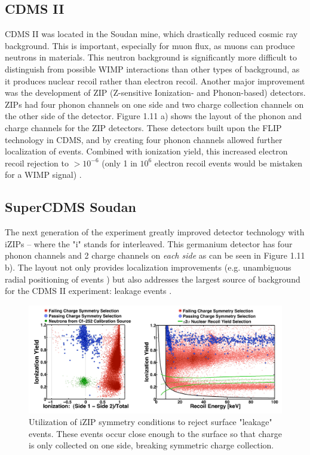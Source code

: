 \documentclass{report}
\begin{document}
\subsection{CDMS II}

CDMS II was located in the Soudan mine, which drastically reduced cosmic ray background. This is important, especially for muon flux, as muons can produce neutrons in materials. This neutron background is significantly more difficult to distinguish from possible WIMP interactions than other types of background, as it produces nuclear recoil rather than electron recoil. Another major improvement was the development of ZIP (Z-sensitive Ionization- and Phonon-based) detectors. ZIPs had four phonon channels on one side and two charge collection channels on the other side of the detector. Figure 1.11 a) shows the layout of the phonon and charge channels for the ZIP detectors. These detectors built upon the FLIP technology in CDMS, and by creating four phonon channels allowed further localization of events. Combined with ionization yield, this increased electron recoil rejection to $> 10^{-6}$ (only 1 in $10^6$ electron recoil events would be mistaken for a WIMP signal) \cite{Saab2012}.

\subsection{SuperCDMS Soudan}

The next generation of the experiment greatly improved detector technology with iZIPs -- where the "i" stands for interleaved. This germanium detector has four phonon channels and 2 charge channels on \emph{each side} as can be seen in Figure 1.11 b). The layout not only provides localization improvements (e.g. unambiguous radial positioning of events \cite{DOE}) but also addresses the largest source of background for the CDMS II experiment: leakage events \cite{Akerib2005}.

\begin{figure}[h]
\centering
\includegraphics[width = .8\textwidth]{iZIP_ionization.png}
\caption{Utilization of iZIP symmetry conditions to reject surface "leakage" events. These events occur close enough to the surface so that charge is only collected on one side, breaking symmetric charge collection.}
\end{figure}
\end{document}
